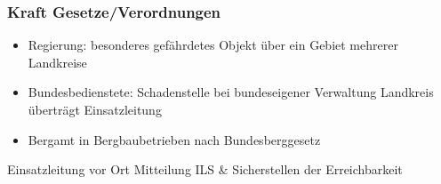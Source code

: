 \begin{normbox}{\subsubsection{Kraft Gesetze/Verordnungen}}
    \begin{itemize}
        \item Regierung: besonderes gefährdetes Objekt über ein Gebiet mehrerer Landkreise
        \item Bundesbedienstete: Schadenstelle bei bundeseigener Verwaltung \ra Landkreis überträgt Einsatzleitung 
        \item Bergamt in Bergbaubetrieben nach Bundesberggesetz
    \end{itemize}
\end{normbox}
\begin{warningbox}{Einsatzleitung vor Ort}
    Mitteilung ILS \& Sicherstellen der Erreichbarkeit
\end{warningbox}
